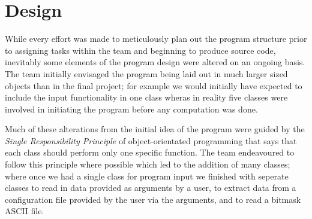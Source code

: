 \section{Design}
\label{Design}
While every effort was made to meticulously plan out the program structure prior to assigning tasks within the team and beginning to produce source code, inevitably some elements of the program design were altered on an ongoing basis. The team initially envisaged the program being laid out in much larger sized objects than in the final project; for example we would initially have expected to include the input functionality in one class wheras in reality five classes were involved in initiating the program before any computation was done. 

Much of these alterations from the initial idea of the program were guided by the \textit{Single Responsibility Principle} of object-orientated programming that says that each class should perform only one specific function. The team endeavoured to follow this principle where possible which led to the addition of many classes; where once we had a single class for program input we finished with seperate classes to read in data provided as arguments by a user, to extract data from a configuration file provided by the user via the arguments, and to read a bitmask ASCII file.
